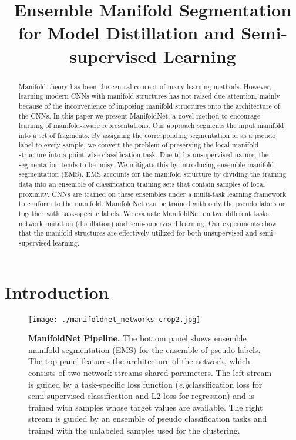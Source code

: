 \documentclass{bmvc2k}
\title{Ensemble Manifold Segmentation for Model Distillation and Semi-supervised Learning}
\def\eg{\emph{e.g}\bmvaOneDot}
\begin{document}
\maketitle
\begin{abstract}

Manifold theory has been the central concept of many learning methods. However, learning modern CNNs with manifold structures has not raised due attention, mainly because of the inconvenience of imposing manifold structures onto the architecture of the CNNs.  
In this paper we present ManifoldNet, a novel method to  encourage learning of manifold-aware representations. Our approach segments the input manifold into a set of fragments. By assigning the corresponding segmentation id as a pseudo label to every sample, we convert the problem of preserving the local manifold structure into a point-wise classification task.
Due to its unsupervised nature, the segmentation tends to be noisy. We mitigate this by introducing ensemble manifold segmentation (EMS). EMS accounts for the manifold structure by dividing the training data into an ensemble of classification training sets that contain samples of local proximity. CNNs are trained on these ensembles under a multi-task learning framework to conform to the manifold. ManifoldNet can be trained with only the pseudo labels or together with task-specific labels.  
We evaluate ManifoldNet on two different tasks: network imitation (distillation) and semi-supervised learning. Our experiments show that the manifold structures are effectively utilized for both unsupervised and semi-supervised learning. 
\end{abstract}

\section{Introduction}
\label{sec:intro}

\begin{figure}[!tb]
\centering
\texttt{[image: ./manifoldnet\_networks-crop2.jpg]} 
\vspace{2mm}
\caption{\textbf{ManifoldNet Pipeline.} The bottom panel shows ensemble manifold segmentation (EMS) for the ensemble of pseudo-labels. The top panel features the architecture of the network, which consists of two network streams shared parameters. The left stream is
guided by a task-specific loss function (\eg classification loss for semi-supervised classification and L2 loss for regression) and is trained with samples whose target values are available. The right stream is guided by an ensemble of pseudo classification tasks and trained with the unlabeled samples used for the clustering.}
\label{fig:pipeline} 
\vspace{-3mm}
\end{figure}
\end{document}
